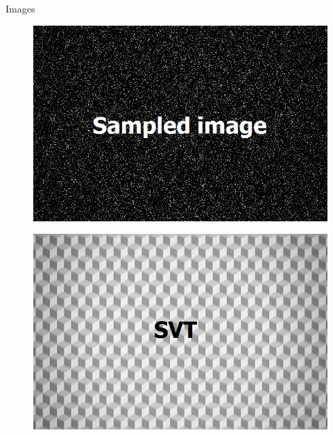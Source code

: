 \documentclass{beamer}
\begin{document}
\begin{frame}{Images}
	\vspace{-0.2cm}
	\begin{multicols}{2}
		\vspace{-0.2cm}
		\begin{figure}[h]
			\centering
			\includegraphics[width=\linewidth]{./../data/images/presentation/with_capture/p4.jpg}
		\end{figure}
		\vspace{-0.2cm}
		\begin{figure}[h]
			\centering
			\includegraphics[width=\linewidth]{./../data/images/presentation/with_capture/p4_1.jpg}
		\end{figure}
	\end{multicols}
	\vspace{-0.4cm}
	\begin{multicols}{3}
		\vspace{-0.4cm}

\end{multicols}
\end{frame}
\end{document}
